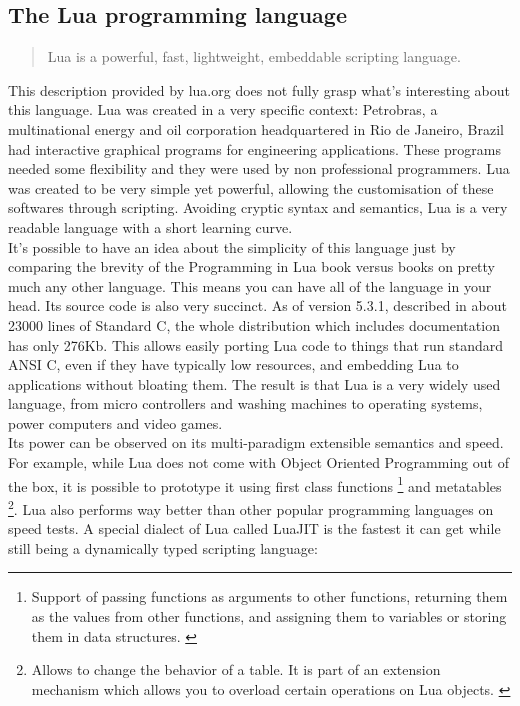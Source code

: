 \documentclass{article}
\begin{document}
\subsection{The Lua programming language}

\begin{quotation}Lua is a powerful, fast, lightweight, embeddable scripting language.\autocite{luaorg}\end{quotation}

This description provided by lua.org does not fully grasp what's interesting about this language. Lua was created in a very specific context: Petrobras, a multinational energy and oil corporation headquartered in Rio de Janeiro, Brazil had interactive graphical programs for engineering applications. These programs needed some flexibility and they were used by non professional programmers. Lua was created to be very simple yet powerful, allowing the customisation of these softwares through scripting. Avoiding cryptic syntax and semantics, Lua is a very readable language with a short learning curve. \\

It's possible to have an idea about the simplicity of this language just by comparing the brevity of the Programming in Lua book versus books on pretty much any other language. This means you can have all of the language in your head. Its source code is also very succinct. As of version 5.3.1, described in about 23000 lines of Standard C, the whole distribution which includes documentation has only 276Kb. This allows easily porting Lua code to things that run standard ANSI C, even if they have typically low resources, and embedding Lua to applications without bloating them. The result is that Lua is a very widely used language, from micro controllers and washing machines to operating systems, power computers and video games.\\

Its power can be observed on its multi-paradigm extensible semantics and speed. For example, while Lua does not come with Object Oriented Programming out of the box, it is possible to prototype it using first class functions \footnote{Support of passing functions as arguments to other functions, returning them as the values from other functions, and assigning them to variables or storing them in data structures. \autocite{wikifunc}} and metatables \footnote{Allows to change the behavior of a table. It is part of an extension mechanism which allows you to overload certain operations on Lua objects. \autocite{luausersmeta} \autocite[117]{pil}}. Lua also performs way better than other popular programming languages on speed tests. A special dialect of Lua called LuaJIT is the fastest it can get while still being a dynamically typed scripting language\autocite[8]{modlua}: \\
\end{document}
